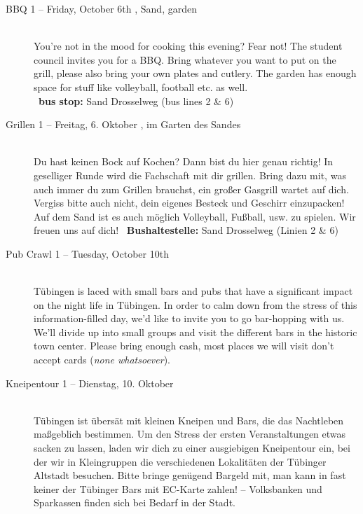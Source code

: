 \begin{description}
\ifml
	\item[BBQ 1 -- Friday, October 6th \YEAR, Sand, garden]~\\%
	You're not in the mood for cooking this evening? Fear not!
    The student council invites you for a BBQ. Bring whatever you want to put on the grill,
    please also bring your own plates and cutlery. The garden has enough space for stuff like volleyball, football etc. as well.\\
	~\textbf{bus stop:} Sand Drosselweg (bus lines 2 \& 6)
\else
	\item[Grillen 1 -- Freitag, 6. Oktober \YEAR, im Garten des Sandes]~\\%
	Du hast keinen Bock auf Kochen? Dann bist du hier genau richtig! In geselliger Runde wird die Fachschaft mit dir grillen.
	Bring dazu mit, was auch immer du zum Grillen brauchst, ein großer Gasgrill wartet auf dich. Vergiss bitte auch nicht, dein eigenes Besteck und Geschirr einzupacken!\\
	Auf dem Sand ist es auch möglich Volleyball, Fußball, usw. zu spielen. Wir freuen uns auf dich!
	~\textbf{Bushaltestelle:} Sand Drosselweg (Linien 2 \& 6)
\fi

\ifml
	\item[Pub Crawl 1 -- Tuesday, October 10th \YEAR]~\\%
	Tübingen is laced with small bars and pubs that have a significant impact on the night life in Tübingen.
	In order to calm down from the stress of this information-filled day, we'd like to invite you to go bar-hopping with us.
	We'll divide up into small groups and visit the different bars in the historic town center.
	Please bring enough cash, most places we will visit don't accept cards (\emph{none whatsoever}).
\else
	\item[Kneipentour 1 -- Dienstag, 10. Oktober \YEAR]~\\%
	Tübingen ist übersät mit kleinen Kneipen und Bars, die das Nachtleben maßgeblich bestimmen.
	Um den Stress der ersten Veranstaltungen etwas sacken zu lassen, laden wir dich zu einer ausgiebigen Kneipentour ein,
	bei der wir in Kleingruppen die verschiedenen Lokalitäten der Tübinger Altstadt besuchen.
	Bitte bringe genügend Bargeld mit, man kann in fast keiner der Tübinger Bars mit EC-Karte zahlen! -- Volksbanken und Sparkassen finden sich bei Bedarf in der Stadt.
\fi


\end{description}
